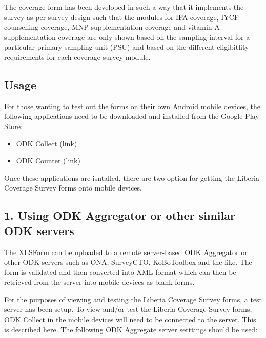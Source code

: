 \documentclass[12pt,a4paper]{book}
\theoremstyle{definition}
\theoremstyle{definition}
\theoremstyle{definition}
\theoremstyle{remark}
\begin{document}
The coverage form has been developed in such a way that it implements
the survey as per survey design such that the modules for IFA coverage,
IYCF counselling coverage, MNP supplementation coverage and vitamin A
supplementation coverage are only shown based on the sampling interval
for a particular primary sampling unit (PSU) and based on the different
eligibitlity requirements for each coverage survey module.

\hypertarget{usage}{%
\subsection{Usage}\label{usage}}

For those wanting to test out the forms on their own Android mobile
devices, the following applications need to be downloaded and installed
from the Google Play Store:

\begin{itemize}
\item
  ODK Collect
  (\href{https://play.google.com/store/apps/details?id=org.odk.collect.android\&hl=en_GB}{link})
\item
  ODK Counter
  (\href{https://play.google.com/store/apps/details?id=org.opendatakit.counter\&hl=en_GB}{link})
\end{itemize}

Once these applications are isntalled, there are two option for getting
the Liberia Coverage Survey forms onto mobile devices.

\hypertarget{using-odk-aggregator-or-other-similar-odk-servers}{%
\subsection{1. Using ODK Aggregator or other similar ODK
servers}\label{using-odk-aggregator-or-other-similar-odk-servers}}

The XLSForm can be uploaded to a remote server-based ODK Aggregator or
other ODK servers such as ONA, SurveyCTO, KoBoToolbox and the like. The
form is validated and then converted into XML format which can then be
retrieved from the server into mobile devices as blank forms.

For the purposes of viewing and testing the Liberia Coverage Survey
forms, a test server has been setup. To view and/or test the Liberia
Coverage Survey forms, ODK Collect in the mobile devices will need to be
connected to the server. This is described
\href{https://docs.opendatakit.org/collect-connect-aggregate/}{here}.
The following ODK Aggregate server setttings should be used:
\end{document}
